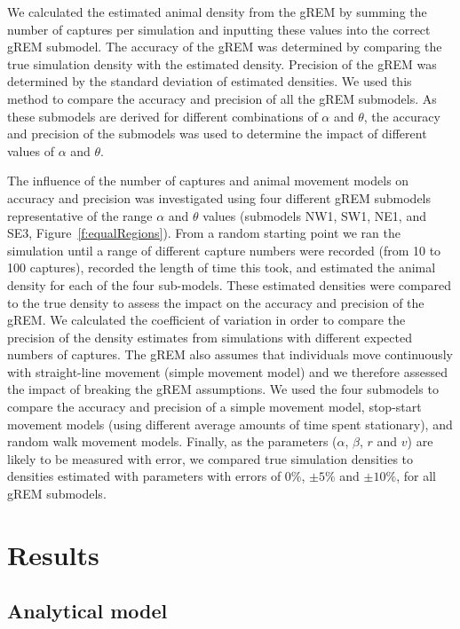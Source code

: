 We calculated the estimated animal density from the gREM by summing the number of captures per simulation and inputting these values into the correct gREM submodel.
The accuracy of the gREM was determined by comparing the true simulation density with the estimated density.
Precision of the gREM was determined by the standard deviation of estimated densities.
We used this method to compare the accuracy and precision of all the gREM submodels.
As these submodels are derived for different combinations of $\alpha$ and $\theta$, the accuracy and precision of the submodels was used to determine the impact of different values of $\alpha$ and $\theta$. 

The influence of the number of captures and animal movement models on accuracy and precision was investigated using four different gREM submodels representative of the range $\alpha$ and $\theta$ values (submodels NW1, SW1, NE1, and SE3, Figure~\ref{f:equalRegions}).
From a random starting point we ran the simulation until a range of different capture numbers were recorded (from 10 to 100 captures), recorded the length of time this took, and estimated the animal density for each of the four sub-models.
These estimated densities were compared to the true density to assess the impact on the accuracy and precision of the gREM.
We calculated the coefficient of variation in order to compare the precision of the density estimates from simulations with different expected numbers of captures.
The gREM also assumes that individuals move continuously with straight-line movement (simple movement model) and we therefore assessed the impact of breaking the gREM assumptions.
We used the four submodels to compare the accuracy and precision of a simple movement model, stop-start movement models (using different average amounts of time spent stationary), and random walk movement models.
Finally, as the parameters ($\alpha$, $\beta$, $r$ and $v$) are likely to be measured with error, we compared true simulation densities to densities estimated with parameters with errors of $0\%$, $\pm 5\%$ and $\pm 10\%$, for all gREM submodels.


\section{Results}

\subsection{Analytical model}

